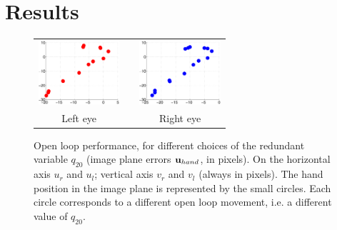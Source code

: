 \section{Results}
\label{sec:results}

\begin{figure}
  \begin{center}
	\begin{tabular}{ccc}
	  \parbox{30mm}{\includegraphics[width=30mm]{Figure/LeftEyeOpenLoop.eps}}  & \hspace{0.1cm} &
	  \parbox{30mm}{\includegraphics[width=30mm]{Figure/RightEyeOpenLoop.eps}}
	  \\
	  \parbox{30mm}{\centering Left eye } & \hspace{0.1cm} & \parbox{30mm}{\centering Right eye }
  \end{tabular}
\end{center}
\caption{Open loop performance, for different choices of the redundant 
variable $q_{20}$ (image plane errors $\mathbf{u}_{hand}$, in pixels). On the horizontal 
axis $u_r$ and $u_l$; vertical axis $v_r$ and $v_l$ (always in pixels).
The hand position in the image plane is represented 
by the small circles.  Each circle corresponds to a different open loop 
movement, i.e. a different value of $q_{20}$.
}\label{Fig:ImagePlaneOpenLoopErrors}
 \end{figure}

